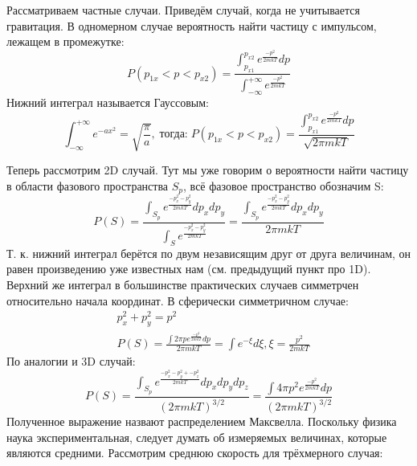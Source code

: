 \documentclass[a4paper, 12pt]{article}
\begin{document}
	Рассматриваем частные случаи. Приведём случай, когда не учитывается гравитация. В одномерном случае вероятность найти частицу с импульсом, лежащем в промежутке:
	\begin{equation*}
		P(p_{1x} < p < p_{x2}) = \frac{\int_{p_{x1}}^{p_{x2}} e^{\frac{-p^{2}} {2mkT} }dp}{ \int_{-\infty}^{+\infty} e^{\frac{-p^{2} } {2mkT} }} 
	\end{equation*}
	Нижний интеграл называется Гауссовым:
	\begin{equation*}
		\int_{-\infty}^{+\infty} e^{-ax^{2}} = \sqrt{\frac{\pi}{a}}, \; \text{тогда:} \; P(p_{1x} < p < p_{x2}) = \frac{\int_{p_{x1}}^{p_{x2}} e^{\frac{-p^{2}} {2mkT} }dp}{ \sqrt{2\pi m k T} }
	\end{equation*}
	
	Теперь рассмотрим 2D случай. Тут мы уже говорим о вероятности найти частицу в области фазового пространства $S_{p}$, всё фазовое пространство обозначим S:
	\begin{equation*}
		P(S) = \frac{\int_{S_{p}} e^{\frac{-p_{x}^{2} -p_{y}^{2}} {2mkT}} dp_{x} dp_{y}}{ \int_{S} e^{\frac{-p_{x}^{2} -p_{y}^{2}} {2mkT} }} = \frac{\int_{S_{p}} e^{\frac{-p_{x}^{2} -p_{y}^{2}} {2mkT}} dp_{x} dp_{y}}{ 2\pi m k T}
	\end{equation*} 
	Т. к.  нижний интеграл берётся по двум независящим друг от друга величинам, он равен произведению уже известных нам (см. предыдущий пункт про 1D).
	Верхний же интеграл в большинстве практических случаев симметрчен относительно начала координат. В сферически симметричном случае:
	\begin{equation*}
		\begin{aligned}
			& p_{x}^2+p_{y}^2=p^2                                                                                         \\
			& P(S)=\frac{ \int 2 \pi p e^\frac{-p^2}{2mkT} dp}{2 \pi mkT} = \int e^{-\xi} d \xi, \xi = \frac{p^{2}}{2mkT} 
		\end{aligned}
	\end{equation*}
	По аналогии и 3D случай:
	\begin{equation*}
		P(S) = \frac{\int_{S_{p}} e^{\frac{-p_{x}^{2} -p_{y}^{2}+-p_{z}^{2}} {2mkT}} dp_{x} dp_{y} dp_{z}}{ (2 \pi mkT)^{3/2}} = \frac{\int 4 \pi p^{2}  e^{\frac{-p^{2}}{2mkT}}dp}{ (2 \pi mkT)^{3/2}}
	\end{equation*}
	Полученное выражение назвают распределением Максвелла. Поскольку физика наука экспериментальная, следует думать об измеряемых величинах, которые являются средними. Рассмотрим среднюю скорость для трёхмерного случая: 
\end{document}
